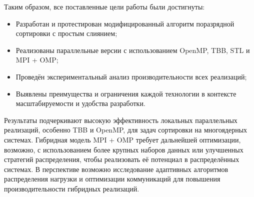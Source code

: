 \documentclass[12pt]{article}
\begin{document}
\hspace*{1.25em}Таким образом, все поставленные цели работы были достигнуты:
\begin{itemize}
  \item Разработан и протестирован модифицированный алгоритм поразрядной сортировки с простым слиянием;
  \item Реализованы параллельные версии с использованием OpenMP, TBB, STL и MPI + OMP;
  \item Проведён экспериментальный анализ производительности всех реализаций;
  \item Выявлены преимущества и ограничения каждой технологии в контексте масштабируемости и удобства разработки.
\end{itemize}

\hspace*{1.25em}Результаты подчеркивают высокую эффективность локальных параллельных реализаций, особенно TBB и OpenMP, для задач сортировки на многоядерных системах. Гибридная модель MPI + OMP требует дальнейшей оптимизации, возможно, с использованием более крупных наборов данных или улучшенных стратегий распределения, чтобы реализовать её потенциал в распределённых системах. В перспективе возможно исследование адаптивных алгоритмов распределения нагрузки и оптимизации коммуникаций для повышения производительности гибридных реализаций.
\end{document}
